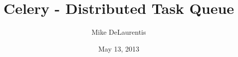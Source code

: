 \documentclass{beamer}
\title{Celery - Distributed Task Queue}
\author{Mike DeLaurentis}
\date{May 13, 2013}
\date{}
\begin{document}
\begin{frame}[plain]
\titlepage
\end{frame}
\end{document}
